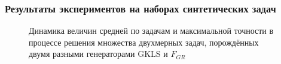 \documentclass[aspectratio=1610]{beamer}
\begin{document}
\begin{frame}
  \frametitle{Результаты экспериментов на наборах синтетических задач}
  \begin{figure}[ht]
    \vspace*{-0.5cm}
      \centering
      \caption{Динамика величин средней по задачам и максимальной точности в процессе решения множества двухмерных задач,
      порождённых двумя разными генераторами GKLS и \(F_{GR}\)}
      \label{fig:devs_mixed}
  \end{figure}
\end{frame}
\end{document}
